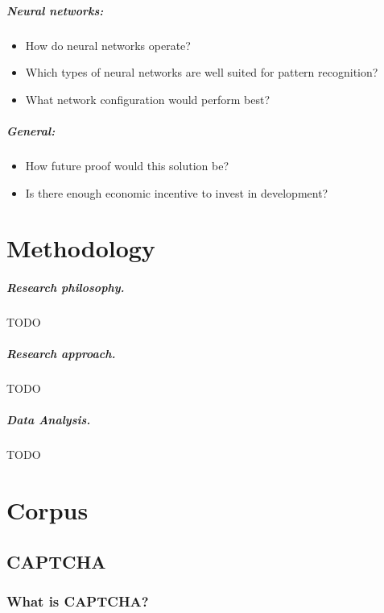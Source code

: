 \documentclass[pdftex,a4paper,12pt,twoside]{report}
\begin{document}
\paragraph{Neural networks:}
\begin{itemize}
\item How do neural networks operate?
\item Which types of neural networks are well suited for pattern recognition?
\item What network configuration would perform best?
\end{itemize}
\paragraph{General:}
\begin{itemize}
\item How future proof would this solution be?
\item Is there enough economic incentive to invest in development?
\end{itemize}
\chapter{Methodology}
\label{ch:methodology}
\paragraph{Research philosophy.}
TODO
\paragraph{Research approach.}
TODO
\paragraph{Data Analysis.}
TODO
\chapter{Corpus}
\label{ch:corpus}
\section{CAPTCHA}
\label{sec:captcha}
\subsection{What is CAPTCHA?}
\end{document}
